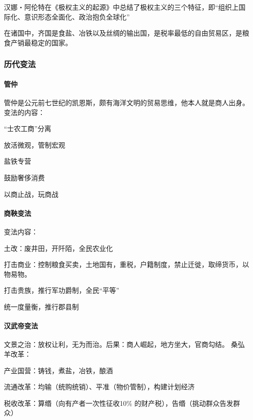 汉娜・阿伦特在《极权主义的起源》中总结了极权主义的三个特征，即“组织上国际化、意识形态全面化、政治抱负全球化”

在诸国中，齐国是食盐、冶铁以及丝绸的输出国，是税率最低的自由贸易区，是粮食产销最稳定的国家。

\subsubsection{历代变法}
\paragraph{管仲}

管仲是公元前七世纪的凯恩斯，颇有海洋文明的贸易思维，他本人就是商人出身。变法的内容：
\begin{itemize*}
	\item “士农工商”分离
	\item 放活微观，管制宏观
	\item 盐铁专营
	\item 鼓励奢侈消费
	\item 以商止战，玩商战
\end{itemize*}

\paragraph{商鞅变法}

变法内容：
\begin{itemize*}
	\item 土改：废井田，开阡陌，全民农业化
	\item 打击商业：控制粮食买卖，土地国有，重税，户籍制度，禁止迁徙，取缔货币，以物易物。
	\item 打击贵族，推行军功爵制，全民“平等”
	\item 统一度量衡，推行郡县制
\end{itemize*}

\paragraph{汉武帝变法}

文景之治：放权让利，无为而治。后果：商人崛起，地方坐大，官商勾结。 
桑弘羊改革：
\begin{itemize*}
	\item 产业国营：铸钱，煮盐，冶铁，酿酒
	\item 流通改革：均输（统购统销）、平准（物价管制），构建计划经济
	\item 税收改革：算缗（向有产者一次性征收10\% 的财产税），告缗（挑动群众告发群众）
\end{itemize*}

